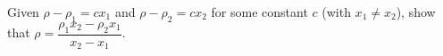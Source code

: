 Given $\rho-\rho_1=cx_1$ and $\rho-\rho_2=cx_2$ for some constant $c$ (with $x_1\ne x_2$), show that $\rho=\dfrac{\rho_1x_2-\rho_2x_1}{x_2-x_1}$.
